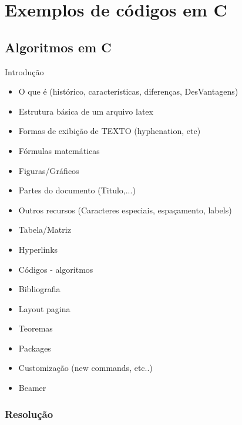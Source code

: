 \section{Exemplos de códigos em C }

\subsection{Algoritmos em C}

\begin{frame}
   \begin{block}{Introdução}
      \begin{itemize}
      \item O que é (histórico, características, diferenças, DesVantagens)
      \item Estrutura básica de um arquivo latex
      \item Formas de exibição de TEXTO (hyphenation, etc)
      \item Fórmulas matemáticas
      \item Figuras/Gráficos
      \item Partes do documento (Titulo,...)
      \item Outros recursos (Caracteres especiais, espaçamento, labels)
      \item Tabela/Matriz
      \item Hyperlinks
      \item Códigos - algoritmos
      \item Bibliografia
      \item Layout pagina
      \item Teoremas
      \item Packages
      \item Customização (new commands, etc..)
      \item Beamer
      \end{itemize}
   \end{block}
\end{frame}

\begin{frame}
  \frametitle{Resolução}
  \inputminted[linenos,fontsize=\scriptsize]{c}{codes/01-valor-absoluto.c}
\end{frame}

